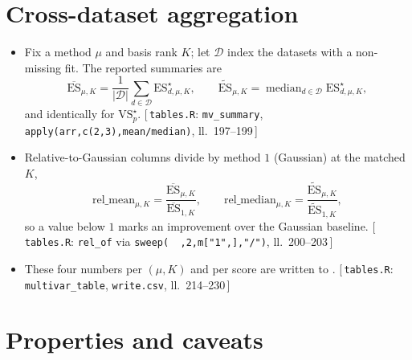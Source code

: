 \documentclass[11pt]{article}
\newcommand{\impl}[1]{{\footnotesize\textsf{\textcolor{blue!45!black}{[\,#1\,]}}}}
\begin{document}
\section{Cross-dataset aggregation}
\label{sec:cross}

\begin{itemize}[leftmargin=1.5em, itemsep=3pt]
  \item Fix a method $\mu$ and basis rank $K$; let $\mathcal D$ index the
        datasets with a non-missing fit. The reported summaries are
        \begin{equation}
          \overline{\mathrm{ES}}_{\mu,K}
            = \frac{1}{|\mathcal D|}\sum_{d\in\mathcal D}
              \mathrm{ES}^\star_{d,\mu,K},
          \qquad
          \widetilde{\mathrm{ES}}_{\mu,K}
            = \operatorname{median}_{d\in\mathcal D}
              \mathrm{ES}^\star_{d,\mu,K},
          \label{eq:agg}
        \end{equation}
        and identically for $\mathrm{VS}_p^\star$.
        \impl{\texttt{tables.R}: \texttt{mv\_summary}, \texttt{apply(arr,c(2,3),mean/median)}, ll.~197--199}
  \item Relative-to-Gaussian columns divide by method $1$ (Gaussian) at
        the matched $K$,
        \begin{equation}
          \mathrm{rel\_mean}_{\mu,K}
            = \frac{\overline{\mathrm{ES}}_{\mu,K}}
                   {\overline{\mathrm{ES}}_{1,K}},
          \qquad
          \mathrm{rel\_median}_{\mu,K}
            = \frac{\widetilde{\mathrm{ES}}_{\mu,K}}
                   {\widetilde{\mathrm{ES}}_{1,K}},
        \end{equation}
        so a value below $1$ marks an improvement over the Gaussian
        baseline.
        \impl{\texttt{tables.R}: \texttt{rel\_of} via \texttt{sweep(\,\textperiodcentered\,,2,m["1",],"/")}, ll.~200--203}
  \item These four numbers per $(\mu,K)$ and per score are written to
        .
        \impl{\texttt{tables.R}: \texttt{multivar\_table}, \texttt{write.csv}, ll.~214--230}
\end{itemize}

\section{Properties and caveats}
\label{sec:caveats}
\end{document}
